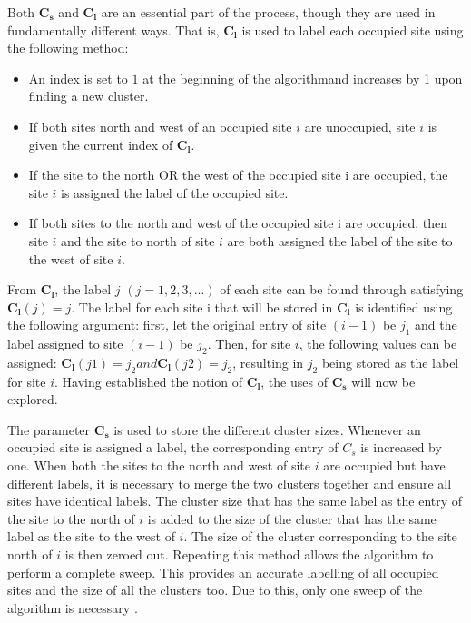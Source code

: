 Both $\mathbf{C_s}$ and $\mathbf{C_l}$ are an essential part of the process, though they are used in fundamentally different ways.
That is, $\mathbf{C_l}$ is used to label each occupied site using the following method:
\begin{itemize}
    \item An index is set to $1$ at the beginning of the algorithm\textemdash and increases by 1 upon finding a new cluster.
    \item If both sites north and west of an occupied site $i$ are unoccupied, site $i$ is given the current index of $\mathbf{C_l}$.
    \item If the site to the north OR the west of the occupied site i are occupied, the site $i$ is assigned the label of the occupied site.
    \item If both sites to the north and west of the occupied site i are occupied, then site $i$ and the site to north of site 
    $i$ are both assigned the label of the site to the west of site $i$.
\end{itemize}

From $\mathbf{C_l}$, the label $j$ $(j = 1,2,3,...)$ of each site can be found through satisfying $\mathbf{C_l}(j) = j$.
The label for each site i that will be stored in $\mathbf{C_l}$ is identified using the following argument:
first, let the original entry of site $(i - 1)$ be $j_1$ and the label assigned to site $(i − 1)$ be $j_2$. 
Then, for site $i$, the following values can be assigned: $\mathbf{C_l}(j1) = j_2 and \mathbf{C_l}(j2) = j_2$, 
resulting in $j_2$ being stored as the label for site $i$. 
Having established the notion of  $\mathbf{C_l}$, the uses of $\mathbf{C_s}$ will now be explored.

The parameter $\mathbf{C_s}$ is used to store the different cluster sizes. 
Whenever an occupied site is assigned a label, 
the corresponding entry of $C_s$ is increased by one. 
When both the sites to the north and west of site $i$ are occupied but have different labels, 
it is necessary to merge the two clusters together and ensure all sites have identical labels. 
The cluster size that has the same label as the entry of the site to the north of $i$ is added to the size of the cluster that has the same label as the site to the west of $i$. 
The size of the cluster corresponding to the site north of $i$ is then zeroed out. 
Repeating this method allows the algorithm to perform a complete sweep. 
This provides an accurate labelling of all occupied sites and the size of all the clusters too. Due to this, only one sweep of the
algorithm is necessary \cite{hoshen1976percolation}.

